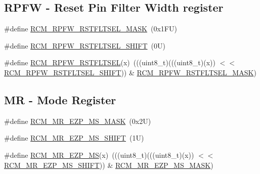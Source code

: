 \subsection*{R\+P\+FW -\/ Reset Pin Filter Width register}
\begin{DoxyCompactItemize}
\item 
\#define \mbox{\hyperlink{group___r_c_m___register___masks_ga60f29f78d245476ae9716d81b5728739}{R\+C\+M\+\_\+\+R\+P\+F\+W\+\_\+\+R\+S\+T\+F\+L\+T\+S\+E\+L\+\_\+\+M\+A\+SK}}~(0x1\+F\+U)
\item 
\#define \mbox{\hyperlink{group___r_c_m___register___masks_ga489d9757284af48af000b769d36bf21a}{R\+C\+M\+\_\+\+R\+P\+F\+W\+\_\+\+R\+S\+T\+F\+L\+T\+S\+E\+L\+\_\+\+S\+H\+I\+FT}}~(0\+U)
\item 
\#define \mbox{\hyperlink{group___r_c_m___register___masks_ga2b2127fc8187199672452ef9f62f6a89}{R\+C\+M\+\_\+\+R\+P\+F\+W\+\_\+\+R\+S\+T\+F\+L\+T\+S\+EL}}(x)~(((uint8\+\_\+t)(((uint8\+\_\+t)(x)) $<$$<$ \mbox{\hyperlink{group___r_c_m___register___masks_ga489d9757284af48af000b769d36bf21a}{R\+C\+M\+\_\+\+R\+P\+F\+W\+\_\+\+R\+S\+T\+F\+L\+T\+S\+E\+L\+\_\+\+S\+H\+I\+FT}})) \& \mbox{\hyperlink{group___r_c_m___register___masks_ga60f29f78d245476ae9716d81b5728739}{R\+C\+M\+\_\+\+R\+P\+F\+W\+\_\+\+R\+S\+T\+F\+L\+T\+S\+E\+L\+\_\+\+M\+A\+SK}})
\end{DoxyCompactItemize}
\subsection*{MR -\/ Mode Register}
\begin{DoxyCompactItemize}
\item 
\#define \mbox{\hyperlink{group___r_c_m___register___masks_ga16d5d09d05454765c2097d0728ba9494}{R\+C\+M\+\_\+\+M\+R\+\_\+\+E\+Z\+P\+\_\+\+M\+S\+\_\+\+M\+A\+SK}}~(0x2\+U)
\item 
\#define \mbox{\hyperlink{group___r_c_m___register___masks_ga3fd9237201ed39d58be104c022385815}{R\+C\+M\+\_\+\+M\+R\+\_\+\+E\+Z\+P\+\_\+\+M\+S\+\_\+\+S\+H\+I\+FT}}~(1\+U)
\item 
\#define \mbox{\hyperlink{group___r_c_m___register___masks_ga7ec2d71163dc6a73e1e38a7fbd9ef8d7}{R\+C\+M\+\_\+\+M\+R\+\_\+\+E\+Z\+P\+\_\+\+MS}}(x)~(((uint8\+\_\+t)(((uint8\+\_\+t)(x)) $<$$<$ \mbox{\hyperlink{group___r_c_m___register___masks_ga3fd9237201ed39d58be104c022385815}{R\+C\+M\+\_\+\+M\+R\+\_\+\+E\+Z\+P\+\_\+\+M\+S\+\_\+\+S\+H\+I\+FT}})) \& \mbox{\hyperlink{group___r_c_m___register___masks_ga16d5d09d05454765c2097d0728ba9494}{R\+C\+M\+\_\+\+M\+R\+\_\+\+E\+Z\+P\+\_\+\+M\+S\+\_\+\+M\+A\+SK}})
\end{DoxyCompactItemize}



